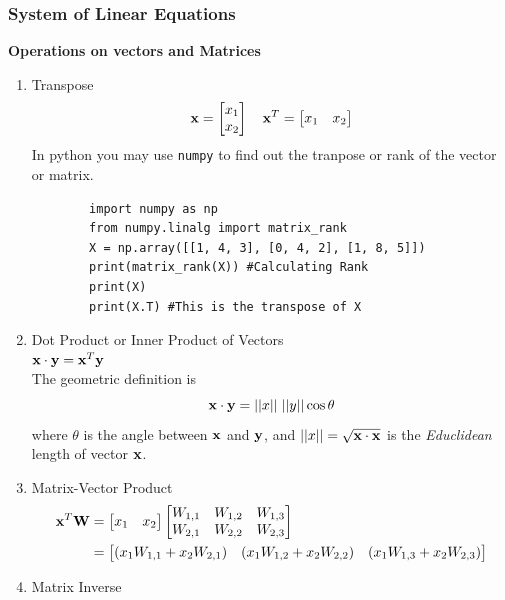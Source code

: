 \subsubsection{System of Linear Equations}
\textbf{Operations on vectors and Matrices}
\begin{enumerate}
    \item Transpose \\
    \[\mathbf{x} = \begin{bmatrix}
        x_1 \\
        x_2
    \end{bmatrix} \quad \mathbf{x}^T = \begin{bmatrix}
        x_1& x_2
    \end{bmatrix}\]
    In python you may use \texttt{numpy} to find out the tranpose or rank of the vector or matrix.
    \begin{verbatim}
        import numpy as np
        from numpy.linalg import matrix_rank
        X = np.array([[1, 4, 3], [0, 4, 2], [1, 8, 5]]) 
        print(matrix_rank(X)) #Calculating Rank
        print(X)
        print(X.T) #This is the transpose of X
    \end{verbatim}
    \item Dot Product or Inner Product of Vectors \\
    $\mathbf{x}\cdot\mathbf{y} = \mathbf{x}^T\mathbf{y}$\\
    The geometric definition is 
    \[\mathbf{x}\cdot\mathbf{y} = ||x||\;||y||\cos{\theta}\]
    where $\theta$ is the angle between $\mathbf{x}$ and $\mathbf{y}$, and $||x|| = \sqrt{\mathbf{x}\cdot\mathbf{x}}$ is the \textit{Educlidean} length of vector $\mathbf{x}$.
    \item Matrix-Vector Product 
    \begin{align*}
        \mathbf{x}^T\mathbf{W} &= \begin{bmatrix} x_1 & x_2 \end{bmatrix} \begin{bmatrix} W_{1,1} & W_{1,2} & W_{1,3} \\ W_{2,1} & W_{2,2} & W_{2,3} \end{bmatrix}\\
        & = \begin{bmatrix} (x_1 W_{1,1} + x_2 W_{2,1}) & (x_1 W_{1,2} + x_2 W_{2,2}) & (x_1 W_{1,3} + x_2 W_{2,3}) \end{bmatrix}
    \end{align*}
    \item Matrix Inverse \\

\end{enumerate}
